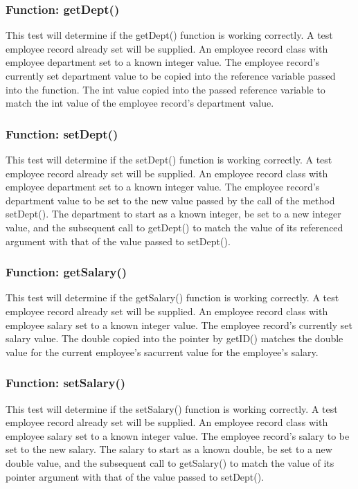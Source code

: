 \documentclass[12pt]{article}%
\newcounter{subsubsubsection}[subsubsection]
\begin{document}
\subsubsection{Function: getDept()}
This test will determine if the getDept() function is working correctly. A test
employee record already set will be supplied.
An employee record class with employee department set to a known integer value.
The employee record's currently set department value to be copied into the reference variable
passed into the function.
The int value copied into the passed reference variable to match the int value of the employee record's
department value.

\subsubsection{Function: setDept()}
This test will determine if the setDept() function is working correctly. A test
employee record already set will be supplied.
An employee record class with employee department set to a known integer value.
The employee record's department value to be set to the new value passed by the call of the method
setDept().
The department to start as a known integer, be set to a new integer value, and the subsequent call
to getDept() to match the value of its referenced argument with that of the value passed to setDept().

\subsubsection{Function: getSalary()}
This test will determine if the getSalary() function is working correctly. A test
employee record already set will be supplied.
An employee record class with employee salary set to a known integer value.
The employee record's currently set salary value.
The double copied into the pointer by getID() matches the double value for the current employee's sacurrent value for the employee's salary.

\subsubsection{Function: setSalary()}
This test will determine if the setSalary() function is working correctly. A test
employee record already set will be supplied.
An employee record class with employee salary set to a known integer value.
The employee record's salary to be set to the new salary.
The salary to start as a known double, be set to a new double value, and the subsequent call
to getSalary() to match the value of its pointer argument with that of the value passed to setDept().
\end{document}
